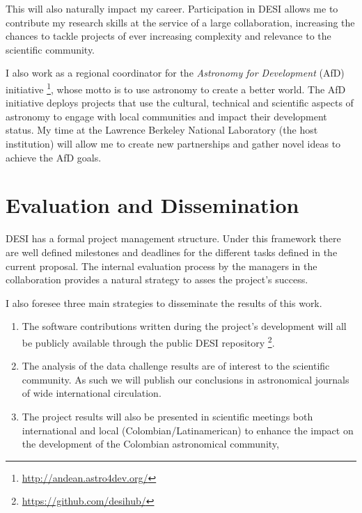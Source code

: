 \documentclass[12pt]{article}
\begin{document}
This will also naturally impact my career. Participation in DESI
allows me to contribute my research skills at the service of a large
collaboration, increasing the chances to tackle  projects of
ever increasing complexity and relevance to the scientific community.  



I also work as a regional coordinator for the \emph{Astronomy for
Development} (AfD)
initiative \footnote{\url{http://andean.astro4dev.org/}}, whose motto
is to use astronomy to create a better world. The AfD initiative
deploys projects that use the cultural, technical  and scientific
aspects of astronomy to engage with local communities and impact their
development status.  My time at the Lawrence Berkeley National
Laboratory (the host institution) will allow me to create new
partnerships and gather novel ideas to achieve the AfD goals.  



\section*{Evaluation and Dissemination}


DESI has a formal project management structure. 
Under this framework there are well defined milestones
and deadlines for the different tasks defined in the current
proposal. The internal evaluation process by the managers in the
collaboration provides a natural strategy to asses the project's success.  

\noindent
I also foresee three main strategies to disseminate the results of this
work.
\begin{enumerate}
\item The software contributions written during the project's
development will all be publicly available through the public DESI
repository \footnote{\url{https://github.com/desihub/}}.  


\item The analysis of the data challenge results are of interest to
the scientific community. As such we will publish our conclusions
in astronomical journals of wide international circulation. 

\item The project results will also be presented in scientific
meetings both international and local (Colombian/Latinamerican) 
to enhance the impact on the development of the Colombian astronomical
community,  
\end{enumerate}
\end{document}
